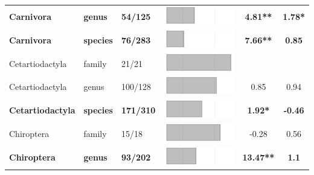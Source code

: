 \begin{longtable}{lL{1.8cm}C{2cm}lcc}
  \textbf{Carnivora} & \textbf{genus} & \textbf{54/125} & \includegraphics[width=0.20\linewidth, height=0.05\linewidth]{Supplementaries/Figures/Chapter2/Results_1c/Table_figures/bar5.pdf} & \textbf{4.81**} & \textbf{1.78*} \\ 
  \textbf{Carnivora} & \textbf{species} & \textbf{76/283} & \includegraphics[width=0.20\linewidth, height=0.05\linewidth]{Supplementaries/Figures/Chapter2/Results_1c/Table_figures/bar6.pdf} & \textbf{7.66**} & \textbf{0.85} \\ 
  Cetartiodactyla & family & 21/21 & \includegraphics[width=0.20\linewidth, height=0.05\linewidth]{Supplementaries/Figures/Chapter2/Results_1c/Table_figures/bar7.pdf} &   &   \\ 
  Cetartiodactyla & genus & 100/128 & \includegraphics[width=0.20\linewidth, height=0.05\linewidth]{Supplementaries/Figures/Chapter2/Results_1c/Table_figures/bar8.pdf} & 0.85 & 0.94 \\ 
  \textbf{Cetartiodactyla} & \textbf{species} & \textbf{171/310} & \includegraphics[width=0.20\linewidth, height=0.05\linewidth]{Supplementaries/Figures/Chapter2/Results_1c/Table_figures/bar9.pdf} & \textbf{1.92*} & \textbf{-0.46} \\ 
  Chiroptera & family & 15/18 & \includegraphics[width=0.20\linewidth, height=0.05\linewidth]{Supplementaries/Figures/Chapter2/Results_1c/Table_figures/bar10.pdf} & -0.28 & 0.56 \\ 
  \textbf{Chiroptera} & \textbf{genus} & \textbf{93/202} & \includegraphics[width=0.20\linewidth, height=0.05\linewidth]{Supplementaries/Figures/Chapter2/Results_1c/Table_figures/bar11.pdf} & \textbf{13.47**} & \textbf{1.1} \\ 

\end{longtable}
